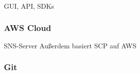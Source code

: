 GUI, API, SDKs

\subsubsection{AWS Cloud}
SNS-Server
Außerdem basiert SCP auf AWS

\subsubsection{Git}

\newpage
